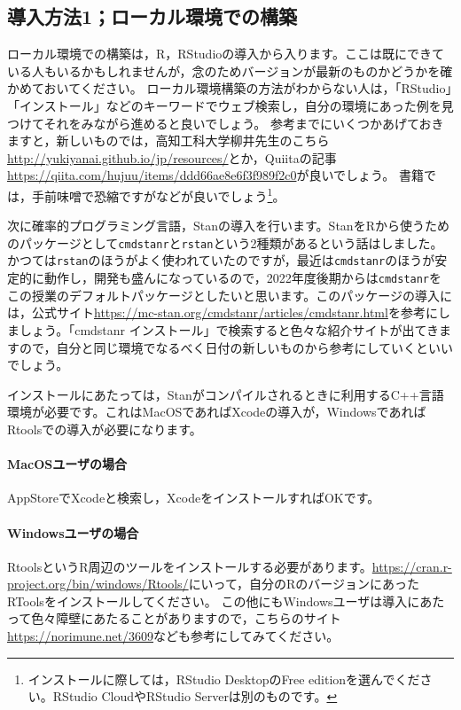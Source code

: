 \documentclass{ltjsbook}
\begin{document}
\subsection{導入方法1；ローカル環境での構築}

ローカル環境での構築は，R，RStudioの導入から入ります。ここは既にできている人もいるかもしれませんが，念のためバージョンが最新のものかどうかを確かめておいてください。
ローカル環境構築の方法がわからない人は，「RStudio」「インストール」などのキーワードでウェブ検索し，自分の環境にあった例を見つけてそれをみながら進めると良いでしょう。
参考までにいくつかあげておきますと，新しいものでは，高知工科大学柳井先生のこちら\url{http://yukiyanai.github.io/jp/resources/}とか，Quiitaの記事\url{https://qiita.com/hujuu/items/ddd66ae8e6f3f989f2c0}が良いでしょう。
書籍では，手前味噌で恐縮ですが\citet{kosugi2019}などが良いでしょう\footnote{インストールに際しては，RStudio DesktopのFree editionを選んでください。RStudio CloudやRStudio Serverは別のものです。}。

次に確率的プログラミング言語，Stanの導入を行います。StanをRから使うためのパッケージとして\texttt{cmdstanr}と\texttt{rstan}という2種類があるという話はしました。かつては\texttt{rstan}のほうがよく使われていたのですが，最近は\texttt{cmdstanr}のほうが安定的に動作し，開発も盛んになっているので，2022年度後期からは\texttt{cmdstanr}をこの授業のデフォルトパッケージとしたいと思います。このパッケージの導入には，公式サイト\url{https://mc-stan.org/cmdstanr/articles/cmdstanr.html}を参考にしましょう。「cmdstanr インストール」で検索すると色々な紹介サイトが出てきますので，自分と同じ環境でなるべく日付の新しいものから参考にしていくといいでしょう。

インストールにあたっては，Stanがコンパイルされるときに利用するC++言語環境が必要です。これはMacOSであればXcodeの導入が，WindowsであればRtoolsでの導入が必要になります。
\paragraph*{MacOSユーザの場合}AppStoreでXcodeと検索し，XcodeをインストールすればOKです。

\paragraph*{Windowsユーザの場合}RtoolsというR周辺のツールをインストールする必要があります。\url{https://cran.r-project.org/bin/windows/Rtools/}にいって，自分のRのバージョンにあったRToolsをインストールしてください。
この他にもWindowsユーザは導入にあたって色々障壁にあたることがありますので，こちらのサイト\url{https://norimune.net/3609}なども参考にしてみてください。
\end{document}
